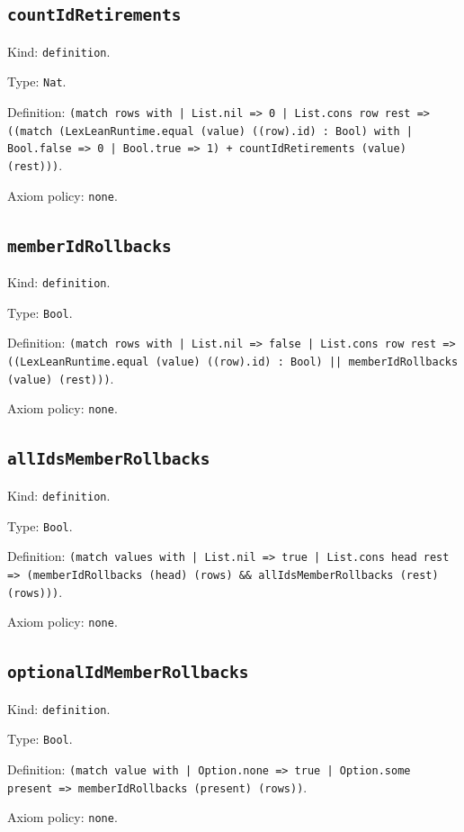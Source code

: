 \documentclass[11pt]{article}
\begin{document}
\subsection*{\texttt{countIdRetirements}}
\noindent Kind: \texttt{definition}.\par
\noindent Type: \texttt{Nat}.\par
\noindent Definition: \texttt{(match rows with | List.nil => 0 | List.cons row rest => ((match (LexLeanRuntime.equal (value) ((row).id) : Bool) with | Bool.false => 0 | Bool.true => 1) + countIdRetirements (value) (rest)))}.\par
\noindent Axiom policy: \texttt{none}.\par
\subsection*{\texttt{memberIdRollbacks}}
\noindent Kind: \texttt{definition}.\par
\noindent Type: \texttt{Bool}.\par
\noindent Definition: \texttt{(match rows with | List.nil => false | List.cons row rest => ((LexLeanRuntime.equal (value) ((row).id) : Bool) || memberIdRollbacks (value) (rest)))}.\par
\noindent Axiom policy: \texttt{none}.\par
\subsection*{\texttt{allIdsMemberRollbacks}}
\noindent Kind: \texttt{definition}.\par
\noindent Type: \texttt{Bool}.\par
\noindent Definition: \texttt{(match values with | List.nil => true | List.cons head rest => (memberIdRollbacks (head) (rows) \&\& allIdsMemberRollbacks (rest) (rows)))}.\par
\noindent Axiom policy: \texttt{none}.\par
\subsection*{\texttt{optionalIdMemberRollbacks}}
\noindent Kind: \texttt{definition}.\par
\noindent Type: \texttt{Bool}.\par
\noindent Definition: \texttt{(match value with | Option.none => true | Option.some present => memberIdRollbacks (present) (rows))}.\par
\noindent Axiom policy: \texttt{none}.\par
\end{document}
